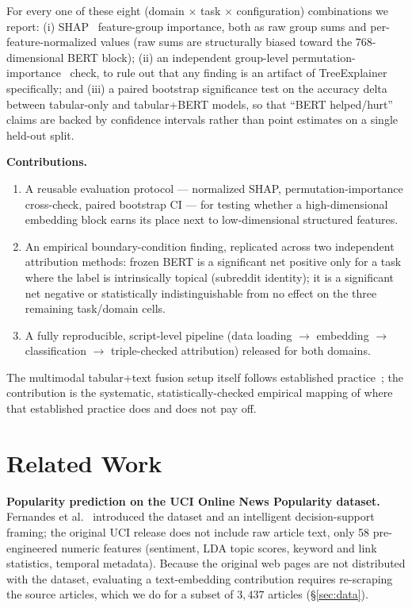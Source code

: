 \documentclass[conference]{IEEEtran}
\begin{document}
For every one of these eight (domain $\times$ task $\times$ configuration) combinations we report: (i) SHAP~\cite{lundberg2017unified} feature-group importance, both as raw group sums and per-feature-normalized values (raw sums are structurally biased toward the 768-dimensional BERT block); (ii) an independent group-level permutation-importance~\cite{breiman2001permutation} check, to rule out that any finding is an artifact of TreeExplainer specifically; and (iii) a paired bootstrap significance test on the accuracy delta between tabular-only and tabular+BERT models, so that ``BERT helped/hurt'' claims are backed by confidence intervals rather than point estimates on a single held-out split.

\textbf{Contributions.}
\begin{enumerate}
    \item A reusable evaluation protocol --- normalized SHAP, permutation-importance cross-check, paired bootstrap CI --- for testing whether a high-dimensional embedding block earns its place next to low-dimensional structured features.
    \item An empirical boundary-condition finding, replicated across two independent attribution methods: frozen BERT is a significant net positive only for a task where the label is intrinsically topical (subreddit identity); it is a significant net negative or statistically indistinguishable from no effect on the three remaining task/domain cells.
    \item A fully reproducible, script-level pipeline (data loading $\to$ embedding $\to$ classification $\to$ triple-checked attribution) released for both domains.
\end{enumerate}

The multimodal tabular+text fusion setup itself follows established practice~\cite{shi2021multimodal}; the contribution is the systematic, statistically-checked empirical mapping of where that established practice does and does not pay off.

\section{Related Work}

\textbf{Popularity prediction on the UCI Online News Popularity dataset.} Fernandes et al.~\cite{fernandes2015proactive} introduced the dataset and an intelligent decision-support framing; the original UCI release does not include raw article text, only 58 pre-engineered numeric features (sentiment, LDA topic scores, keyword and link statistics, temporal metadata). Because the original web pages are not distributed with the dataset, evaluating a text-embedding contribution requires re-scraping the source articles, which we do for a subset of $3{,}437$ articles (\S\ref{sec:data}).
\end{document}
